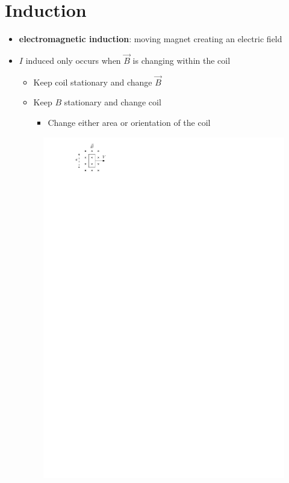 \documentclass{article}
\begin{document}
  \section{Induction}
    \begin{itemize}
      \item \textbf{electromagnetic induction}: moving magnet creating an electric field
      \item $I$ induced only occurs when $\vec{B}$ is changing within the coil
        \begin{itemize}
          \item Keep coil stationary and change $\vec{B}$
          \item Keep $B$ stationary and change coil
            \begin{itemize}
              \item Change either area or orientation of the coil
            \end{itemize} 
        \end{itemize}
      \begin{figure}[H]
        \centering
        \includegraphics{figures/faraday1.pdf}

\end{figure}
\end{itemize}
\end{document}
